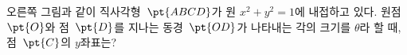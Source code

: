 \noindent\begin{minipage}[t]{0.58\linewidth}\vspace{0pt}\raggedright 오른쪽 그림과 같이 직사각형~$\pt{ABCD}$가 원 $x^2+y^2=1$에 내접하고 있다. 원점~$\pt{O}$와 점~$\pt{D}$를 지나는 동경~$\pt{OD}$가 나타내는 각의 크기를 $\theta$라 할 때, 점~$\pt{C}$의 $y$좌표는? \end{minipage}\hfill\begin{minipage}[t]{0.4\linewidth}\vspace{0pt}\centering \resizebox{\ifdim\width>\linewidth\linewidth\else\width\fi}{!}{}\end{minipage}\par
\dmchoicesauto{}{$-\sin\theta$}{$-\cos\theta$}{$\sin\theta$}{$\cos\theta$}{$\tan\theta$}
